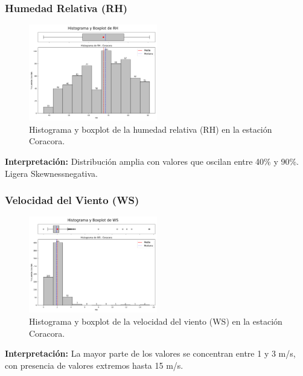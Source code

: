 \subsubsection*{Humedad Relativa (RH)}
\begin{figure}[H]
\centering
\includegraphics[width=0.5\textwidth]{resultados/por_estacion_meteorologica/Coracora/RH_histograma.png}
\caption{Histograma y boxplot de la humedad relativa (RH) en la estación Coracora.}
\label{fig:coracora_RH}
\end{figure}
\textbf{Interpretación:} Distribución amplia con valores que oscilan entre 40\% y 90\%. Ligera Skewnessnegativa.

\subsubsection*{Velocidad del Viento (WS)}
\begin{figure}[H]
\centering
\includegraphics[width=0.5\textwidth]{resultados/por_estacion_meteorologica/Coracora/WS_histograma.png}
\caption{Histograma y boxplot de la velocidad del viento (WS) en la estación Coracora.}
\label{fig:coracora_WS}
\end{figure}
\textbf{Interpretación:} La mayor parte de los valores se concentran entre 1 y 3 m/s, con presencia de valores extremos hasta 15 m/s.

